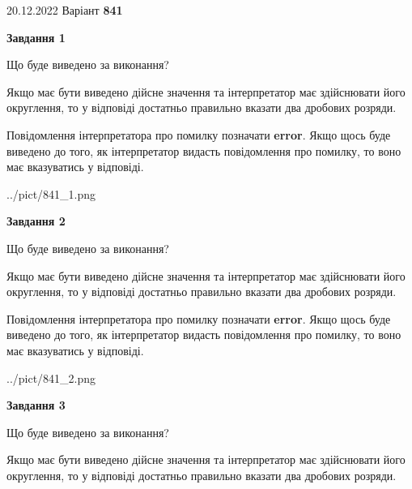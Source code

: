 \documentclass[12pt, ukrainian]{article}
\begin{document}
{20.12.2022 Варіант \No \textbf { 841 }\par}
{
\begin {Large}

{\begin {center}\textbf{Завдання 1}\end {center}}\par
Що буде виведено за виконання? \par

Якщо має бути виведено дійсне значення та інтерпретатор має здійснювати його округлення, 
то у відповіді достатньо правильно вказати два дробових розряди.

Повідомлення інтерпретатора про помилку позначати \textbf{error}.
Якщо щось буде виведено до того, як інтерпретатор видасть повідомлення про помилку, 
то воно має вказуватись у відповіді. \par

\begin{center}
	{../pict/841_1.png}
\end{center}
\newpage

{\begin {center}\textbf{Завдання 2}\end {center}}\par
Що буде виведено за виконання? \par

Якщо має бути виведено дійсне значення та інтерпретатор має здійснювати його округлення, 
то у відповіді достатньо правильно вказати два дробових розряди.

Повідомлення інтерпретатора про помилку позначати \textbf{error}.
Якщо щось буде виведено до того, як інтерпретатор видасть повідомлення про помилку, 
то воно має вказуватись у відповіді. \par

\begin{center}
	{../pict/841_2.png}
\end{center}
\newpage

{\begin {center}\textbf{Завдання 3}\end {center}}\par
Що буде виведено за виконання? \par

Якщо має бути виведено дійсне значення та інтерпретатор має здійснювати його округлення, 
то у відповіді достатньо правильно вказати два дробових розряди.


\end{Large}}
\end{document}
